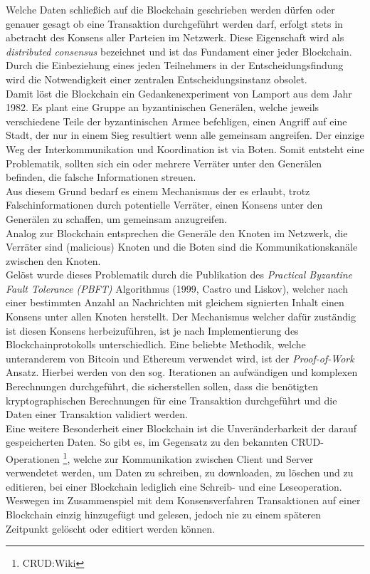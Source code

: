 Welche Daten schließich auf die Blockchain geschrieben werden dürfen oder genauer gesagt ob eine Transaktion durchgeführt werden darf, erfolgt stets in abetracht des Konsens aller Parteien im Netzwerk. Diese Eigenschaft wird als \textit{distributed consensus} bezeichnet und ist das Fundament einer jeder Blockchain. Durch die Einbeziehung eines jeden Teilnehmers in der Entscheidungsfindung wird die Notwendigkeit einer zentralen Entscheidungsinstanz obsolet. \\
Damit löst die Blockchain ein Gedankenexperiment von Lamport aus dem Jahr 1982. Es plant eine Gruppe an byzantinischen Generälen, welche jeweils verschiedene Teile der byzantinischen Armee befehligen, einen Angriff auf eine Stadt, der nur in einem Sieg resultiert wenn alle gemeinsam angreifen. Der einzige Weg der Interkommunikation und Koordination ist via Boten. Somit entsteht eine Problematik, sollten sich ein oder mehrere Verräter unter den Generälen befinden, die falsche Informationen streuen.\\
Aus diesem Grund bedarf es einem Mechanismus der es erlaubt, trotz Falschinformationen durch potentielle Verräter, einen Konsens unter den Generälen zu schaffen, um gemeinsam anzugreifen. \\
Analog zur Blockchain entsprechen die Generäle den Knoten im Netzwerk, die Verräter sind  (malicious) Knoten und die Boten sind die Kommunikationskanäle zwischen den Knoten.\\
Gelöst wurde dieses Problematik durch die Publikation des \textit{Practical Byzantine Fault Tolerance (PBFT)} Algorithmus (1999, Castro und Liskov), welcher nach einer bestimmten Anzahl an Nachrichten mit gleichem signierten Inhalt einen Konsens unter allen Knoten herstellt.   
Der Mechanismus welcher dafür zuständig ist diesen Konsens herbeizuführen, ist je nach Implementierung des Blockchainprotokolls unterschiedlich. Eine beliebte Methodik, welche unteranderem von Bitcoin und Ethereum verwendet wird, ist der  \textit{Proof-of-Work} Ansatz. Hierbei werden von den sog.  Iterationen an aufwändigen und komplexen Berechnungen durchgeführt, die sicherstellen sollen, dass die benötigten kryptographischen Berechnungen für eine Transaktion durchgeführt und die Daten einer Transaktion validiert werden.\\
Eine weitere Besonderheit einer Blockchain ist die Unveränderbarkeit der darauf gespeicherten Daten. So gibt es, im Gegensatz zu den bekannten CRUD-Operationen \footnote{CRUD:Wiki}, welche zur Kommunikation zwischen Client und Server verwendetet werden, um Daten zu schreiben, zu downloaden, zu löschen und zu editieren, bei einer Blockchain lediglich eine Schreib- und eine Leseoperation. Weswegen im Zusammenspiel mit dem Konsensverfahren Transaktionen auf einer Blockchain einzig hinzugefügt und gelesen, jedoch nie zu einem späteren Zeitpunkt gelöscht oder editiert werden können. \\
